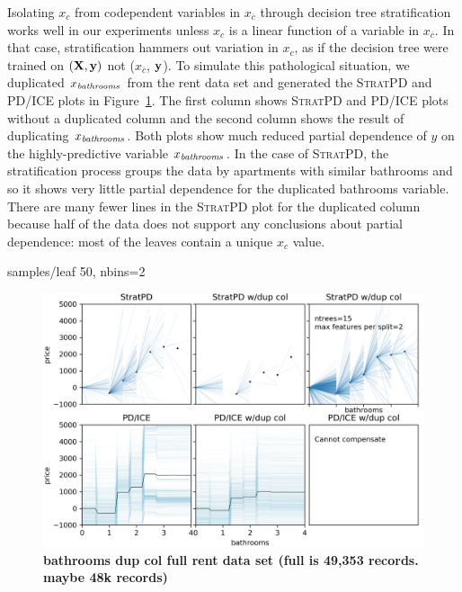 \documentclass[12pt]{article}
\newcommand{\figref}[1]{Figure~\ref{#1}}
\newcommand{\spd}{\fontfamily{cmr}\textsc{\small StratPD}}
\newcommand{\xnc}{$x_{\overline{c}}$}
\begin{document}
Isolating $x_c$ from codependent variables in \xnc{} through decision tree stratification works well in our experiments unless $x_c$ is a linear function of a variable in \xnc{}. In that case, stratification hammers out variation in $x_c$, as if the decision tree were trained on $(\bf X, y)$ not (\xnc, $\bf y$). To simulate this pathological situation, we duplicated $x_{\it bathrooms}$ from the rent data set and generated the \spd{} and PD/ICE plots in \figref{fig:baths_dup}. The first column shows \spd{} and PD/ICE plots without a duplicated column and the second column shows the result of duplicating $x_{\it bathrooms}$. Both plots show much reduced partial dependence of $y$ on the highly-predictive variable $x_{\it bathrooms}$. In the case of \spd{}, the stratification process groups the data by apartments with similar bathrooms and so it shows very little partial dependence for the duplicated bathrooms variable.   There are many fewer lines in the \spd{} plot for the duplicated column because half of the data does not support any conclusions about partial dependence: most of the leaves contain a unique $x_c$ value.

samples/leaf 50, nbins=2


\begin{figure}[htbp]
\begin{center}
\includegraphics[scale=0.6]{images/bathrooms_vs_price_dup.png}
\caption{{\bf  bathrooms dup col full rent data set (full is 49,353 records. maybe 48k records)}}
\label{fig:baths_dup}
\end{center}
\end{figure}
\end{document}
